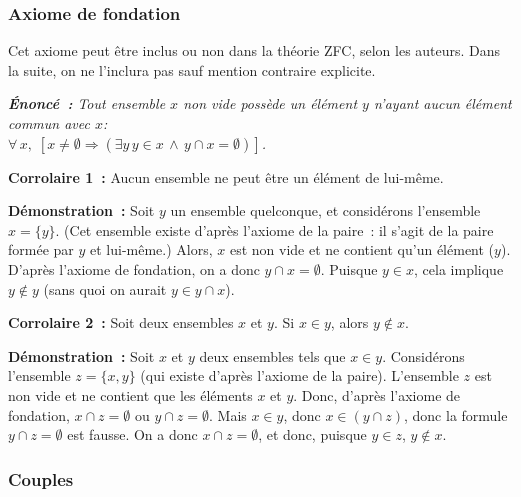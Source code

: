 \subsubsection{Axiome de fondation} 

Cet axiome peut être inclus ou non dans la théorie ZFC, selon les auteurs. 
Dans la suite, on ne l'inclura pas sauf mention contraire explicite.

\medskip

\noindent\textit{\textbf{Énoncé :} Tout ensemble $x$ non vide possède un élément $y$ n'ayant aucun élément commun avec $x$: \\
$\forall \, x, \; \left[ x \neq \emptyset \Rightarrow (\exists y \, y \in x \, \wedge \, y \cap x = \emptyset) \right]$.} 

\medskip

\noindent\textbf{Corrolaire 1 :} Aucun ensemble ne peut être un élément de lui-même. 

\medskip

\noindent\textbf{Démonstration :} Soit $y$ un ensemble quelconque, et considérons l'ensemble $x = \lbrace y \rbrace$. 
(Cet ensemble existe d'après l'axiome de la paire : il s'agit de la paire formée par $y$ et lui-même.)
Alors, $x$ est non vide et ne contient qu'un élément ($y$). 
D'après l'axiome de fondation, on a donc $y \cap x = \emptyset$. 
Puisque $y \in x$, cela implique $y \notin y$ (sans quoi on aurait $y \in y \cap x$). 

\done

\medskip

\noindent\textbf{Corrolaire 2 :} Soit deux ensembles $x$ et $y$. Si $x \in y$, alors $y \notin x$. 

\medskip

\noindent\textbf{Démonstration :} Soit $x$ et $y$ deux ensembles tels que $x \in y$. 
Considérons l'ensemble $z = \lbrace x,y  \rbrace$ (qui existe d'après l'axiome de la paire). 
L'ensemble $z$ est non vide et ne contient que les éléments $x$ et $y$. 
Donc, d'après l'axiome de fondation, $x \cap z = \emptyset$ ou $y \cap z = \emptyset$. 
Mais $x \in y$, donc $x \in (y \cap z)$, donc la formule $y \cap z = \emptyset$ est fausse. 
On a donc $x \cap z = \emptyset$, et donc, puisque $y \in z$, $y \notin x$. 

\done

\subsubsection{Couples} 


